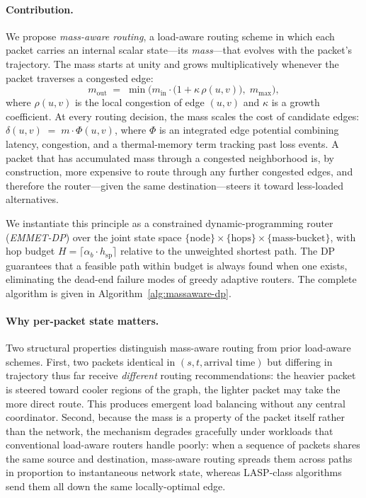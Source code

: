 \paragraph{Contribution.}
We propose \emph{mass-aware routing}, a load-aware routing scheme in
which each packet carries an internal scalar state---its
\emph{mass}---that evolves with the packet's trajectory. The mass
starts at unity and grows multiplicatively whenever the packet
traverses a congested edge:
\begin{equation}
m_{\text{out}} \;=\; \min\!\Big(m_{\text{in}}\cdot
                       \big(1 + \kappa\,\rho(u,v)\big),\; m_{\max}\Big),
\label{eq:mass-update-intro}
\end{equation}
where $\rho(u,v)$ is the local congestion of edge $(u,v)$ and
$\kappa$ is a growth coefficient. At every routing decision, the
mass scales the cost of candidate edges:
\(\delta(u,v) \;=\; m \cdot \Phi(u,v)\), where $\Phi$ is an integrated
edge potential combining latency, congestion, and a thermal-memory
term tracking past loss events. A packet that has accumulated
mass through a congested neighborhood is, by construction, more
expensive to route through any further congested edges, and
therefore the router---given the same destination---steers it
toward less-loaded alternatives.

We instantiate this principle as a constrained dynamic-programming
router (\emph{EMMET-DP}) over the joint state space
$\{\text{node}\}\times\{\text{hops}\}\times\{\text{mass-bucket}\}$,
with hop budget $H = \lceil\alpha_b\cdot h_{\text{sp}}\rceil$
relative to the unweighted shortest path. The DP guarantees that
a feasible path within budget is always found when one exists,
eliminating the dead-end failure modes of greedy adaptive routers.
The complete algorithm is given in
Algorithm~\ref{alg:massaware-dp}.

\paragraph{Why per-packet state matters.}
Two structural properties distinguish mass-aware routing from
prior load-aware schemes. First, two packets identical in
$(s,t,\text{arrival time})$ but differing in trajectory thus far
receive \emph{different} routing recommendations: the heavier
packet is steered toward cooler regions of the graph, the lighter
packet may take the more direct route. This produces emergent load
balancing without any central coordinator. Second, because the
mass is a property of the packet itself rather than the network,
the mechanism degrades gracefully under workloads that conventional
load-aware routers handle poorly: when a sequence of packets shares
the same source and destination, mass-aware routing spreads them
across paths in proportion to instantaneous network state, whereas
LASP-class algorithms send them all down the same locally-optimal
edge.

